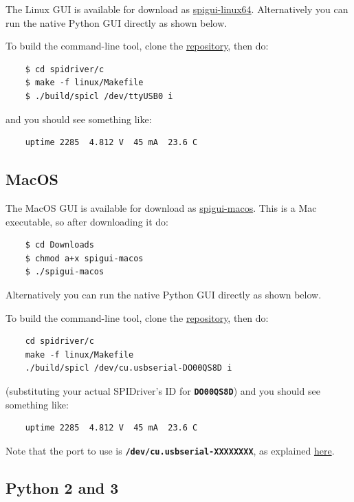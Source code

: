 \documentclass{article}
\newcommand{\mach}[1]{\texttt{\textbf{#1}}}
\begin{document}
The Linux GUI is available for download as
\href{https://github.com/jamesbowman/spidriver/releases/download/v0.1.0/spigui-linux64}{spigui-linux64}.
Alternatively you can run the native Python GUI directly as shown below.

To build the command-line tool, clone the
\href{https://github.com/jamesbowman/spidriver}{repository}, then do:
\begin{lstlisting}
    $ cd spidriver/c
    $ make -f linux/Makefile
    $ ./build/spicl /dev/ttyUSB0 i
\end{lstlisting}
and you should see something like:

\begin{lstlisting}
    uptime 2285  4.812 V  45 mA  23.6 C
\end{lstlisting}

\subsection{MacOS}

The MacOS GUI is available for download as
\href{https://github.com/jamesbowman/spidriver/releases/download/v0.1.0/spigui-macos}{spigui-macos}.
This is a Mac executable, so after downloading it do:
\begin{lstlisting}
    $ cd Downloads
    $ chmod a+x spigui-macos
    $ ./spigui-macos
\end{lstlisting}

Alternatively you can run the native Python GUI directly as shown below.

To  build the command-line tool, clone the
\href{https://github.com/jamesbowman/spidriver}{repository}, then do:

\begin{lstlisting}
    cd spidriver/c
    make -f linux/Makefile
    ./build/spicl /dev/cu.usbserial-DO00QS8D i
\end{lstlisting}

(substituting your actual SPIDriver's ID for \mach{DO00QS8D})
and you should see something like:
\begin{lstlisting}
    uptime 2285  4.812 V  45 mA  23.6 C
\end{lstlisting}

Note that the port to use is \mach{/dev/cu.usbserial-XXXXXXXX}, as explained
\href{https://pbxbook.com/other/mac-tty.html}{here}.

\subsection{Python 2 and 3}
\end{document}
